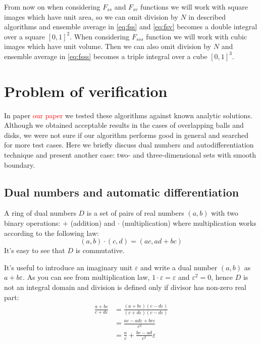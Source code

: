 \documentclass[reprint,amsmath,amssymb,aps,pre,showkeys,showpacs]{revtex4-1}
\begin{document}
From now on when considering $F_{ss}$ and $F_{sv}$ functions we will work with
square images which have unit area, so we can omit division by $N$ in described
algorithms and ensemble average in \cref{eq:fss} and \cref{eq:fsv} becomes a
double integral over a square $[0, 1]^2$. When considering $F_{sss}$ function we
will work with cubic images which have unit volume. Then we can also omit
division by $N$ and ensemble average in \cref{eq:fsss} becomes a triple integral
over a cube $[0, 1]^3$.

\section{Problem of verification}
\label{sec:verify}
In paper \textcolor{red}{our paper} we tested these algorithms against known
analytic solutions. Although we obtained acceptable results in the cases of
overlapping balls and disks, we were not sure if our algorithm performs good in
general and searched for more test cases. Here we briefly discuss dual numbers
and autodifferentiation technique and present another case: two- and
three-dimensional sets with smooth boundary.

\subsection{Dual numbers and automatic differentiation}
\label{sec:dual}
A ring of dual numbers $D$ is a set of pairs of real numbers $(a, b)$ with two
binary operations: $+$ (addition) and $\cdot$ (multiplication) where
multiplication works according to the following law:
\begin{equation*}
  (a, b)\cdot(c, d) = (ac, ad + bc)
\end{equation*}
It's easy to see that $D$ is commutative.

It's useful to introduce an imaginary unit $\varepsilon$ and write a dual number
$(a, b)$ as $a + b\varepsilon$. As you can see from multiplication law,
$1\cdot \varepsilon = \varepsilon$ and $\varepsilon^2 = 0$, hence $D$ is not an
integral domain and division is defined only if divisor has non-zero real part:
\begin{align*}
  \frac{a+b\varepsilon}{c+d\varepsilon} &=
  \frac{(a+b\varepsilon)(c-d\varepsilon)}{(c+d\varepsilon)(c-d\varepsilon)} \\
  &= \frac{ac-ad\varepsilon+bc\varepsilon}{c^2} \\
  &= \frac{a}{c} + \frac{bc-ad}{c^2}\varepsilon
\end{align*}
\end{document}
